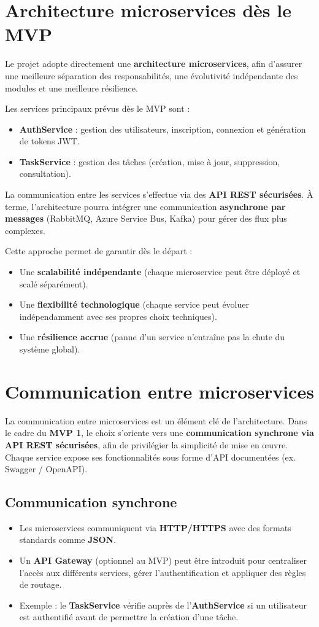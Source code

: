 \section{Architecture microservices dès le MVP}
Le projet adopte directement une \textbf{architecture microservices}, afin d’assurer une meilleure séparation des responsabilités, une évolutivité indépendante des modules et une meilleure résilience.  

Les services principaux prévus dès le MVP sont :
\begin{itemize}
	\item \textbf{AuthService} : gestion des utilisateurs, inscription, connexion et génération de tokens JWT.
	\item \textbf{TaskService} : gestion des tâches (création, mise à jour, suppression, consultation).
\end{itemize}

La communication entre les services s’effectue via des \textbf{API REST sécurisées}.  
À terme, l’architecture pourra intégrer une communication \textbf{asynchrone par messages} (RabbitMQ, Azure Service Bus, Kafka) pour gérer des flux plus complexes.  

Cette approche permet de garantir dès le départ :
\begin{itemize}
	\item Une \textbf{scalabilité indépendante} (chaque microservice peut être déployé et scalé séparément).
	\item Une \textbf{flexibilité technologique} (chaque service peut évoluer indépendamment avec ses propres choix techniques).
	\item Une \textbf{résilience accrue} (panne d’un service n’entraîne pas la chute du système global).
\end{itemize}

\section{Communication entre microservices}
La communication entre microservices est un élément clé de l’architecture. Dans le cadre du \textbf{MVP 1}, le choix s’oriente vers une \textbf{communication synchrone via API REST sécurisées}, afin de privilégier la simplicité de mise en œuvre. Chaque service expose ses fonctionnalités sous forme d’API documentées (ex. Swagger / OpenAPI).  

\subsection{Communication synchrone}
\begin{itemize}
	\item Les microservices communiquent via \textbf{HTTP/HTTPS} avec des formats standards comme \textbf{JSON}.
	\item Un \textbf{API Gateway} (optionnel au MVP) peut être introduit pour centraliser l’accès aux différents services, gérer l’authentification et appliquer des règles de routage.
	\item Exemple : le \textbf{TaskService} vérifie auprès de l’\textbf{AuthService} si un utilisateur est authentifié avant de permettre la création d’une tâche.
\end{itemize}

